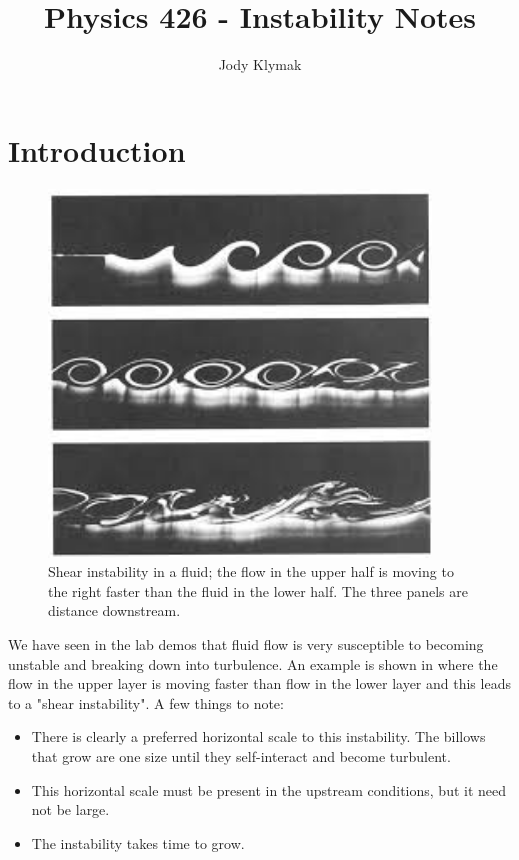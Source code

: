 \documentclass[11pt]{article}
\title{Physics 426 - Instability Notes}
\author{Jody Klymak}
\begin{document}
\maketitle
\pagestyle{fancy}
\section{Introduction}

\begin{figure}[hbtp]
  \begin{center}
    \includegraphics[width=4in]{images/Instability.jpg}
    \caption{Shear instability in a fluid; the flow in the upper half is moving
to the right faster than the fluid in the lower half.   The three panels are
distance downstream.}
    \label{fig:Instability}
  \end{center}
\end{figure}

We have seen in the lab demos that fluid flow is very susceptible to becoming
unstable and breaking down into turbulence.  An example is shown in
 where the flow in the upper layer is moving faster than
flow in the lower layer and this leads to a "shear instability".  A few things
to note:

\begin{itemize}
  \item There is clearly a preferred horizontal scale to this instability.  The
billows that grow are one size until they self-interact and become turbulent.
  \item This horizontal scale must be present in the upstream conditions, but
it need not be large.  
  \item The instability takes time to grow. 
\end{itemize}
\end{document}
